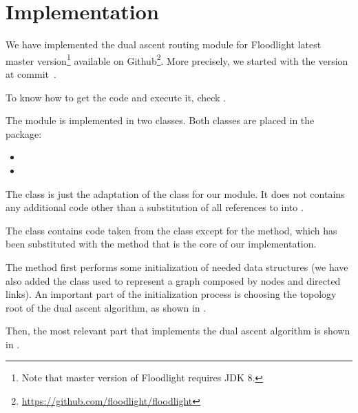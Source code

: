 \chapter{Implementation}\label{ch:implementation}

We have implemented the dual ascent routing module for Floodlight latest master
version\footnote{Note that master version of Floodlight requires JDK 8.}
available on Github\footnote{\url{https://github.com/floodlight/floodlight}}.
More precisely, we started with the version at
commit~\href{https://github.com/floodlight/floodlight/tree/d737cb05656a6038f4e2277ffb4503d45b7b29cb}{}.

To know how to get the code and execute it, check
.

The module is implemented in two classes. Both classes are placed in the
 package:
\begin{itemize}
	\item {}
	\item {}
\end{itemize}

The  class is just the adaptation of the
 class for our module. It does not contains any additional
code other than a substitution of all references to  into
.

The  class contains code taken from the
 class except for the  method, which has
been substituted with the  method that is the core of our
implementation.

The  method first performs some initialization of needed data
structures (we have also added the  class used to represent a graph
composed by nodes and directed links). An important part of the initialization
process is choosing the topology root of the dual ascent algorithm, as shown in
.



Then, the most relevant part that implements the dual ascent algorithm is shown
in .



